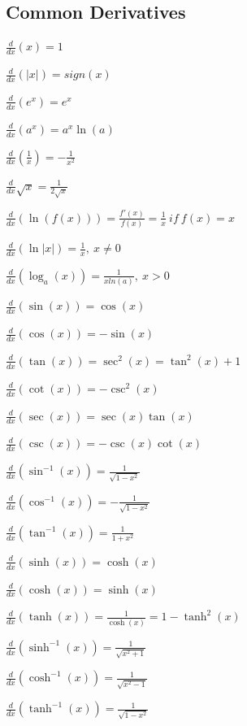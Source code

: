 \documentclass[8pt,a4paper]{extarticle}     %
\theoremstyle{definition}
\theoremstyle{definition}
\theoremstyle{definition}
\begin{document}
\begin{multicols}{4}
\subsection{Common Derivatives}
\begin{bulletlist}
	\item $\frac{d}{dx}(x) = 1$
	\item $\frac{d}{dx}(|x|) = sign(x)$
	\item $\frac{d}{dx}(e^x) = e^x$
	\item $\frac{d}{dx}(a^x) = a^x\ln(a)$
	\item $\frac{d}{dx}(\frac{1}{x}) = -\frac{1}{x^2}$
	\item $\frac{d}{dx}\sqrt{x} = \frac{1}{2\sqrt{x}}$
	\item $\frac{d}{dx}(\ln(f(x))) = \frac{f'(x)}{f(x)} = \frac{1}{x} \ \textit{if} \ f(x) = x$
	\item $\frac{d}{dx}(\ln|x|) = \frac{1}{x},\ x\neq0$
	\item $\frac{d}{dx}(\log_{a}(x)) = \frac{1}{xln(a)},\ x>0$
	\item $\frac{d}{dx}(\sin(x)) = \cos(x)$
	\item $\frac{d}{dx}(\cos(x)) = -\sin(x)$
	\item $\frac{d}{dx}(\tan(x)) = \sec^2(x) = \tan^2(x)+1$
	\item $\frac{d}{dx}(\cot(x)) = -\csc^2(x)$
	\item $\frac{d}{dx}(\sec(x)) = \sec(x)\tan(x)$
	\item $\frac{d}{dx}(\csc(x)) = -\csc(x)\cot(x)$
	\item $\frac{d}{dx}(\sin^{-1}(x)) = \frac{1}{\sqrt{1-x^2}}$
	\item $\frac{d}{dx}(\cos^{-1}(x)) = -\frac{1}{\sqrt{1-x^2}}$
	\item $\frac{d}{dx}(\tan^{-1}(x)) = \frac{1}{1+x^2}$
	\item $\frac{d}{dx}(\sinh(x)) = \cosh(x)$
	\item $\frac{d}{dx}(\cosh(x)) = \sinh(x)$
	\item $\frac{d}{dx}(\tanh(x)) = \frac{1}{\cosh(x)} = 1-\tanh^2(x)$
	\item $\frac{d}{dx}(\sinh^{-1}(x)) = \frac{1}{\sqrt{x^2+1}}$
	\item $\frac{d}{dx}(\cosh^{-1}(x)) = \frac{1}{\sqrt{x^2-1}}$
	\item $\frac{d}{dx}(\tanh^{-1}(x)) = \frac{1}{\sqrt{1-x^2}}$
\end{bulletlist}


\end{multicols}
\end{document}
